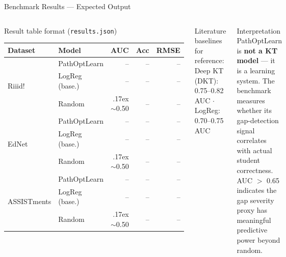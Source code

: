 \documentclass[aspectratio=169,12pt]{beamer}
\begin{document}
\begin{frame}{Benchmark Results — Expected Output}
  \begin{columns}
      \begin{block}{Result table format (\texttt{results.json})}
        \begin{center}\scriptsize
        \begin{tabular}{llrrr}
          \toprule
          \textbf{Dataset} & \textbf{Model} & \textbf{AUC} & \textbf{Acc} & \textbf{RMSE} \\
          \midrule
          \multirow{3}{*}{Riiid!}
            & PathOptLearn   & -- & -- & -- \\
            & LogReg (base.) & -- & -- & -- \\
            & Random         & {\raise.17ex\hbox{$\scriptstyle\sim$}}0.50 & -- & -- \\
          \midrule
          \multirow{3}{*}{EdNet}
            & PathOptLearn   & -- & -- & -- \\
            & LogReg (base.) & -- & -- & -- \\
            & Random         & {\raise.17ex\hbox{$\scriptstyle\sim$}}0.50 & -- & -- \\
          \midrule
          \multirow{3}{*}{ASSISTments}
            & PathOptLearn   & -- & -- & -- \\
            & LogReg (base.) & -- & -- & -- \\
            & Random         & {\raise.17ex\hbox{$\scriptstyle\sim$}}0.50 & -- & -- \\
          \bottomrule
        \end{tabular}
        \end{center}
      \end{block}
      \vspace{4pt}
      \scriptsize Literature baselines for reference:\\
      Deep KT (DKT): 0.75–0.82 AUC $\cdot$
      LogReg: 0.70–0.75 AUC
      \begin{alertblock}{Interpretation}
        \small PathOptLearn is \textbf{not a KT model} —
        it is a learning system. The benchmark measures
        whether its gap-detection signal correlates with
        actual student correctness.\\[6pt]
        AUC $>$ 0.65 indicates the gap severity proxy
        has meaningful predictive power beyond random.

\end{alertblock}
\end{columns}
\end{frame}
\end{document}
